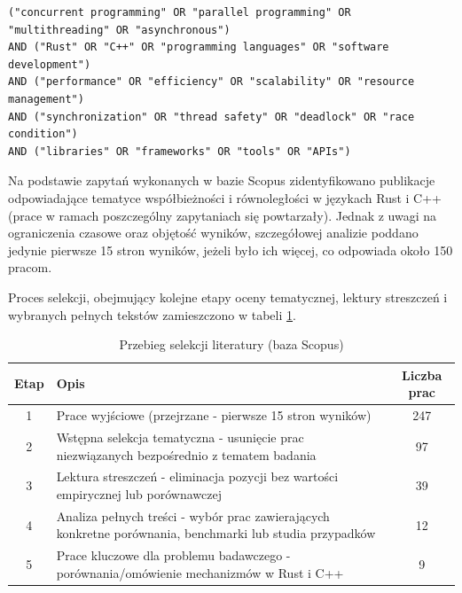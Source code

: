 \lstset{breaklines=true}
\begin{lstlisting}[caption=Kwerenda wygenerowana przez AI, label=AIQuery]
("concurrent programming" OR "parallel programming" OR "multithreading" OR "asynchronous")
AND ("Rust" OR "C++" OR "programming languages" OR "software development")
AND ("performance" OR "efficiency" OR "scalability" OR "resource management")
AND ("synchronization" OR "thread safety" OR "deadlock" OR "race condition")
AND ("libraries" OR "frameworks" OR "tools" OR "APIs")
\end{lstlisting}

Na podstawie zapytań wykonanych w bazie Scopus zidentyfikowano publikacje odpowiadające tematyce współbieżności i równoległości w językach Rust i C++ (prace w ramach poszczególny zapytaniach się powtarzały). Jednak z uwagi na ograniczenia czasowe oraz objętość wyników, szczegółowej analizie poddano jedynie pierwsze 15 stron wyników, jeżeli było ich więcej, co odpowiada około 150 pracom.

Proces selekcji, obejmujący kolejne etapy oceny tematycznej, lektury streszczeń i wybranych pełnych tekstów zamieszczono w tabeli \ref{table:selectionProcessScopus}.

\begin{table}[H]
    \caption{Przebieg selekcji literatury (baza Scopus)} 
    \label{table:selectionProcessScopus}
    \begin{tabular}{cp{11.5cm}c}
    \hline
    Etap & Opis & Liczba prac  \\ \hline 
    1 & Prace wyjściowe (przejrzane - pierwsze 15 stron wyników) & 247 \\ \hline 
    2 & Wstępna selekcja tematyczna - usunięcie prac niezwiązanych bezpośrednio z tematem badania & 97 \\ \hline 
    3 & Lektura streszczeń - eliminacja pozycji bez wartości empirycznej lub porównawczej & 39 \\ \hline 
    4 & Analiza pełnych treści - wybór prac zawierających konkretne porównania, benchmarki lub studia przypadków & 12 \\ \hline 
    5 & Prace kluczowe dla problemu badawczego - porównania/omówienie mechanizmów w Rust i C++ & 9 \\ \hline 
    \end{tabular} 
\end{table}

